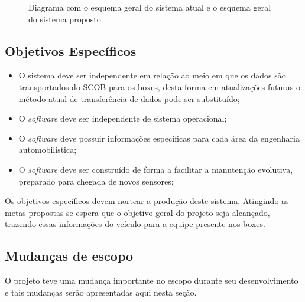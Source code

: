 \begin{figure}[!htb]
	\center
	\caption{Diagrama com o esquema geral do sistema atual e o esquema geral do sistema proposto.}
	\qquad
	\label{fig:esquemageral}
\end{figure}


\subsection{Objetivos Específicos} 

\begin{itemize}[label={-}]
	\item O sistema deve ser independente em relação ao meio em que os dados são transportados do SCOB para os boxes, desta forma em atualizações futuras o método atual de transferência de dados pode ser substituído;
	\item O \textit{software} deve ser independente de sistema operacional;
	\item O \textit{software} deve possuir informações específicas para cada área da engenharia automobilística;
	\item O \textit{software} deve ser construído de forma a facilitar a manutenção evolutiva, preparado para chegada de novos sensores;
\end{itemize}

Os objetivos específicos devem nortear a produção deste sistema. Atingindo as metas propostas se espera que o objetivo geral do projeto seja alcançado, trazendo essas informações do veículo para a equipe presente nos boxes.

\subsection{Mudanças de escopo}
O projeto teve uma mudança importante no escopo durante seu desenvolvimento e tais mudanças serão apresentadas aqui nesta seção.

